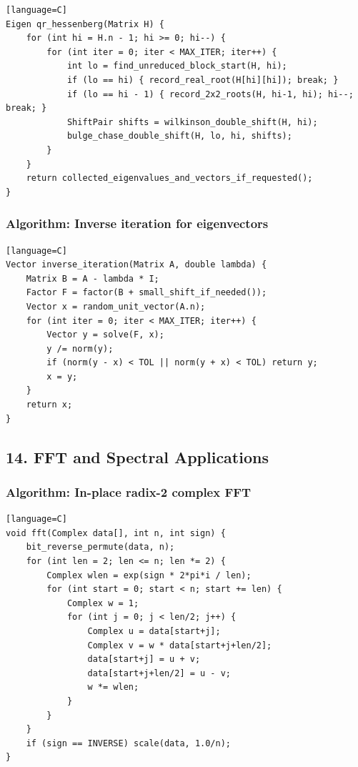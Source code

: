\documentclass[11pt]{article}
\begin{document}
\begin{verbatim}[language=C]
Eigen qr_hessenberg(Matrix H) {
    for (int hi = H.n - 1; hi >= 0; hi--) {
        for (int iter = 0; iter < MAX_ITER; iter++) {
            int lo = find_unreduced_block_start(H, hi);
            if (lo == hi) { record_real_root(H[hi][hi]); break; }
            if (lo == hi - 1) { record_2x2_roots(H, hi-1, hi); hi--; break; }
            ShiftPair shifts = wilkinson_double_shift(H, hi);
            bulge_chase_double_shift(H, lo, hi, shifts);
        }
    }
    return collected_eigenvalues_and_vectors_if_requested();
}
\end{verbatim}

\subsubsection{Algorithm: Inverse iteration for eigenvectors}\label{algorithm-inverse-iteration-for-eigenvectors}

\begin{verbatim}[language=C]
Vector inverse_iteration(Matrix A, double lambda) {
    Matrix B = A - lambda * I;
    Factor F = factor(B + small_shift_if_needed());
    Vector x = random_unit_vector(A.n);
    for (int iter = 0; iter < MAX_ITER; iter++) {
        Vector y = solve(F, x);
        y /= norm(y);
        if (norm(y - x) < TOL || norm(y + x) < TOL) return y;
        x = y;
    }
    return x;
}
\end{verbatim}

\subsection{14. FFT and Spectral Applications}\label{fft-and-spectral-applications}

\subsubsection{Algorithm: In-place radix-2 complex FFT}\label{algorithm-in-place-radix-2-complex-fft}

\begin{verbatim}[language=C]
void fft(Complex data[], int n, int sign) {
    bit_reverse_permute(data, n);
    for (int len = 2; len <= n; len *= 2) {
        Complex wlen = exp(sign * 2*pi*i / len);
        for (int start = 0; start < n; start += len) {
            Complex w = 1;
            for (int j = 0; j < len/2; j++) {
                Complex u = data[start+j];
                Complex v = w * data[start+j+len/2];
                data[start+j] = u + v;
                data[start+j+len/2] = u - v;
                w *= wlen;
            }
        }
    }
    if (sign == INVERSE) scale(data, 1.0/n);
}
\end{verbatim}
\end{document}
